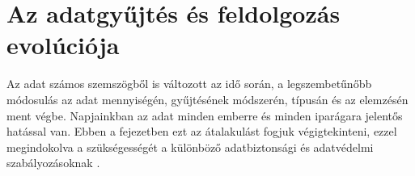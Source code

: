 \chapter{Az adatgyűjtés és feldolgozás evolúciója} \label{adat-evolucio}

Az adat számos szemszögből is változott az idő során, a legszembetűnőbb módosulás az adat mennyiségén, gyűjtésének módszerén, típusán és az elemzésén ment végbe. Napjainkban az adat minden emberre és minden iparágara jelentős hatással van. Ebben a fejezetben ezt az átalakulást fogjuk végigtekinteni, ezzel megindokolva a szükségességét a különböző adatbiztonsági és adatvédelmi szabályozásoknak \cite{villanova-university-2020,gutcheck-2020}.



